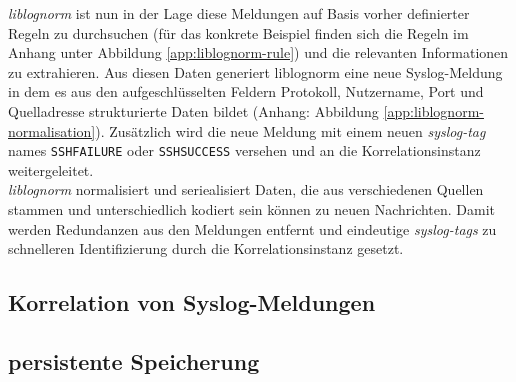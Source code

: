 \textit{liblognorm} ist nun in der Lage diese Meldungen auf Basis vorher definierter 
Regeln zu durchsuchen (für das konkrete Beispiel finden sich die Regeln im Anhang unter 
Abbildung \ref{app:liblognorm-rule}) und die relevanten Informationen zu extrahieren.  
Aus diesen Daten generiert liblognorm eine neue Syslog-Meldung in dem es aus den 
aufgeschlüsselten Feldern Protokoll, Nutzername, Port und Quelladresse strukturierte 
Daten bildet (Anhang: Abbildung \ref{app:liblognorm-normalisation}). Zusätzlich wird die 
neue Meldung mit einem neuen \textit{syslog-tag} names \texttt{SSHFAILURE} oder 
\texttt{SSHSUCCESS} versehen und an die Korrelationsinstanz weitergeleitet.\\

\textit{liblognorm} normalisiert und seriealisiert Daten, die aus verschiedenen Quellen 
stammen und unterschiedlich kodiert sein können zu neuen Nachrichten. Damit werden 
Redundanzen aus den Meldungen entfernt und eindeutige \textit{syslog-tags} zu schnelleren 
Identifizierung durch die Korrelationsinstanz gesetzt. 
\newpage

\subsection{Korrelation von Syslog-Meldungen}\label{syslog-korrelation}




\subsection{persistente Speicherung}\label{nosql}